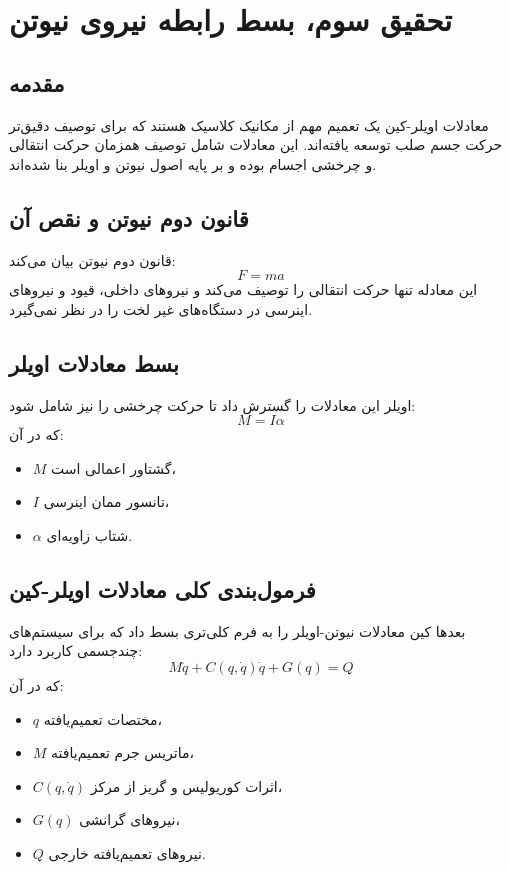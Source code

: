 
\chapter*{تحقیق سوم، بسط رابطه نیروی نیوتن}

\section*{مقدمه}
معادلات اویلر-کین یک تعمیم مهم از مکانیک کلاسیک هستند که برای توصیف دقیق‌تر حرکت جسم صلب توسعه یافته‌اند. این معادلات شامل توصیف همزمان حرکت انتقالی و چرخشی اجسام بوده و بر پایه اصول نیوتن و اویلر بنا شده‌اند.

\section*{قانون دوم نیوتن و نقص آن}
قانون دوم نیوتن بیان می‌کند:
\begin{equation}
	F = ma
\end{equation}
این معادله تنها حرکت انتقالی را توصیف می‌کند و نیروهای داخلی، قیود و نیروهای اینرسی در دستگاه‌های غیر لخت را در نظر نمی‌گیرد.

\section*{بسط معادلات اویلر}
اویلر این معادلات را گسترش داد تا حرکت چرخشی را نیز شامل شود:
\begin{equation}
	M = I \alpha
\end{equation}
که در آن:
\begin{itemize}
	\item $M$ گشتاور اعمالی است،
	\item $I$ تانسور ممان اینرسی،
	\item $\alpha$ شتاب زاویه‌ای.
\end{itemize}

\section*{فرمول‌بندی کلی معادلات اویلر-کین}
بعدها کین معادلات نیوتن-اویلر را به فرم کلی‌تری بسط داد که برای سیستم‌های چندجسمی کاربرد دارد:
\begin{equation}
	M \ddot{q} + C(q, \dot{q}) \dot{q} + G(q) = Q
\end{equation}
که در آن:
\begin{itemize}
	\item $q$ مختصات تعمیم‌یافته،
	\item $M$ ماتریس جرم تعمیم‌یافته،
	\item $C(q, \dot{q})$ اثرات کوریولیس و گریز از مرکز،
	\item $G(q)$ نیروهای گرانشی،
	\item $Q$ نیروهای تعمیم‌یافته خارجی.
\end{itemize}

